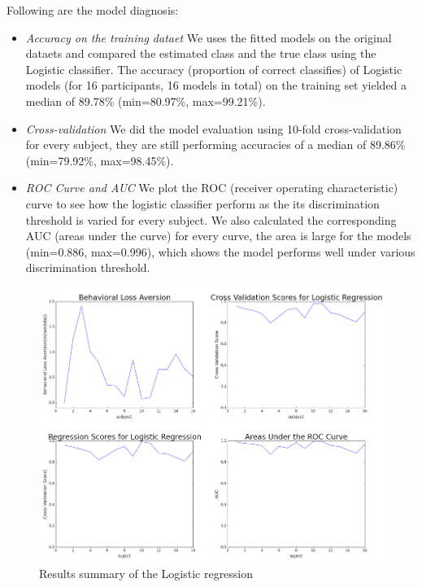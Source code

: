 \documentclass[11pt]{article}
\begin{document}
Following are the model diagnosis:

\begin{itemize}
\item \emph{Accuracy on the training dataet} We uses the fitted models on the 
original dataets and compared the estimated class and the true class using the 
Logistic classifier. The accuracy (proportion of correct classifies) of 
Logistic models (for 16 participants, 16 
models in total) on the training set yielded a median of 89.78\% (min=80.97\%, 
max=99.21\%).
\item \emph{Cross-validation} We did the model evaluation using 10-fold 
cross-validation for every subject, they are still performing accuracies of a 
median of 89.86\% (min=79.92\%, max=98.45\%).
\item \emph{ROC Curve and AUC} We plot the ROC (receiver operating 
characteristic) curve to see how the logistic classifier perform as the its 
discrimination threshold is varied for every subject. We also calculated the 
corresponding AUC (areas under the curve) for every curve, the area is large 
for the models (min=0.886, max=0.996), which shows the model performs well 
under various discrimination threshold.

\end{itemize}

\begin{figure}[H]
    \centering
        \includegraphics[scale=0.4]{figures/Regression1/logistic_summary.png}
    \caption{Results summary of the Logistic regression}
\end{figure}
\end{document}
